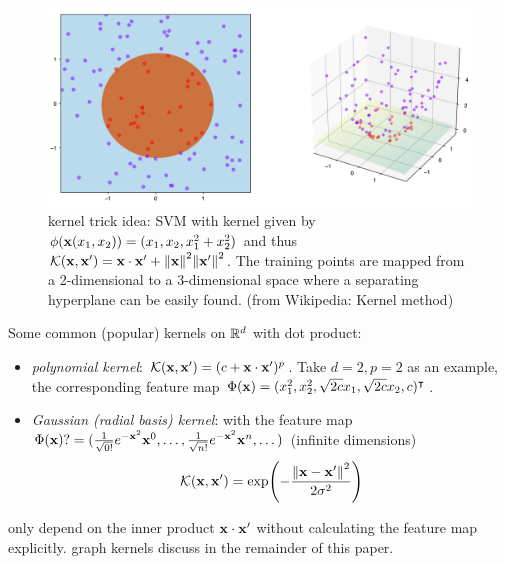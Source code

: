 \begin{figure}[!ht]
	\centering
	\includegraphics[width=0.6\linewidth]{Kernel_trick_idea.png}
	\caption{kernel trick idea: SVM with kernel given by $\phi(\vb{x}(x_1, x_2)) = (x_1, x_2, x_1^2 + x_2^2)$ and thus $\mathcal{K}(\vb{x},\vb{x}')=\vb{x}\cdot \vb{x}' + \norm{\vb{x}}^2 \norm{\vb{x}'}^2$. The training points are mapped from a 2-dimensional to a 3-dimensional space where a separating hyperplane can be easily found. (from Wikipedia: Kernel method)}
	\label{fig:kernel}
\end{figure}
Some common (popular) kernels on $\mathbb{R}^d$ with dot product:
\begin{itemize}
	\item \emph{polynomial kernel}:
	$\mathcal{K}(\vb{x},\vb{x}')=(c+\vb{x}\cdot \vb{x}')^p$.
	Take $d=2,p=2$ as an example, the corresponding feature map $\Phi(\vb{x})=(x_1^2,x_2^2,\sqrt{2c}x_1,\sqrt{2c}x_2,c)^\intercal$.

	\item \emph{Gaussian (radial basis) kernel}:
	with the feature map $\Phi(\vb{x})?=(\frac{1}{\sqrt{0!}}e^{-\vb{x}^2}\vb{x}^0,\dots,\frac{1}{\sqrt{n!}}e^{-\vb{x}^2}\vb{x}^n,\dots)$ (infinite dimensions)
	\begin{equation}
		\mathcal{K}(\vb{x},\vb{x}') = 
		\exp(-\frac{\norm{\vb{x}-\vb{x}'}^2}{2\sigma^2})
		\label{eq:gaussian_kernel}
	\end{equation}

\end{itemize}
only depend on the inner product $\vb{x}\cdot\vb{x}'$ without calculating the feature map explicitly. 
graph kernels discuss in the remainder of this paper.

